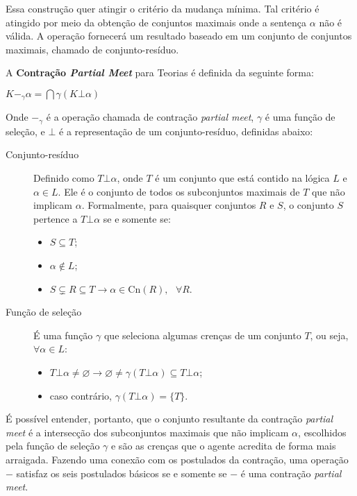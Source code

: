 Essa construção quer atingir o critério da mudança mínima. Tal critério é atingido por meio da obtenção de conjuntos maximais onde a sentença $ \alpha $ não é válida. A operação fornecerá um resultado baseado em um conjunto de conjuntos maximais, chamado de conjunto-resíduo.

A \textbf{Contração \textit{Partial Meet}} para Teorias é definida da seguinte forma: 

\begin{center}
	$ K -_{\gamma} \alpha = \bigcap \gamma(K \bot \alpha) $
\end{center}

Onde $ -_{\gamma} $ é a operação chamada de contração \textit{partial meet}, $ \gamma $ é uma função de seleção, e $ \bot $ é a representação de um conjunto-resíduo, definidas abaixo:

\begin{description}
	\item[Conjunto-resíduo] Definido como $ T \bot \alpha $, onde $ T $ é um conjunto que está contido na lógica $ L $ e $ \alpha \in L $. Ele é o conjunto de todos os subconjuntos maximais de $ T $ que não implicam $ \alpha $. Formalmente, para quaisquer conjuntos $ R $ e $ S $, o conjunto $ S $ pertence a $ T \bot \alpha $ se e somente se:
	\begin{itemize}
		\item $ S \subseteq T $;
		\item $ \alpha \notin L $;
		\item $ S \subsetneq R \subseteq T \to \alpha \in \text{Cn}(R), \text{ }\forall R$.
	\end{itemize}
	\item[Função de seleção] É uma função $ \gamma $ que seleciona algumas crenças de um conjunto $ T $, ou seja, $ \forall \alpha \in L $:
	\begin{itemize}
		\item $ T \bot \alpha \neq \varnothing \to \varnothing \neq \gamma(T \bot \alpha) \subseteq T \bot \alpha $;
		\item caso contrário, $ \gamma(T \bot \alpha) = \{T\} $.
	\end{itemize}
\end{description}

É possível entender, portanto, que o conjunto resultante da contração \textit{partial meet} é a intersecção dos subconjuntos maximais que não implicam $ \alpha $, escolhidos pela função de seleção $ \gamma $ e são as crenças que o agente acredita de forma mais arraigada. Fazendo uma conexão com os postulados da contração, uma operação $ - $ satisfaz os seis postulados básicos se e somente se $ - $ é uma contração \textit{partial meet}.

